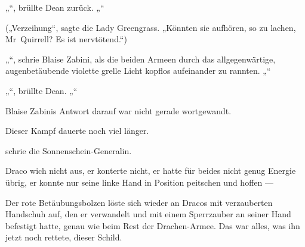 „“, brüllte Dean zurück.
„“

(„Verzeihung“, sagte die Lady Greengrass.
„Könnten sie aufhören, so zu lachen, Mr~Quirrell? Es ist nervtötend.“)

„“, schrie Blaise Zabini, als die beiden Armeen durch das allgegenwärtige, augenbetäubende violette grelle Licht kopflos aufeinander zu rannten.
„“

„“, brüllte Dean.
„“

Blaise Zabinis Antwort darauf war nicht gerade wortgewandt.

Dieser Kampf dauerte noch viel länger.

\later

 schrie die Sonnenschein-Generalin.

Draco wich nicht aus, er konterte nicht, er hatte für beides nicht genug Energie übrig, er konnte nur seine linke Hand in Position peitschen und hoffen —

Der rote Betäubungsbolzen löste sich wieder an Dracos mit  verzauberten Handschuh auf, den er verwandelt und mit einem Sperrzauber an seiner Hand befestigt hatte, genau wie beim Rest der Drachen-Armee. Das war alles, was ihn jetzt noch rettete, dieser Schild.

